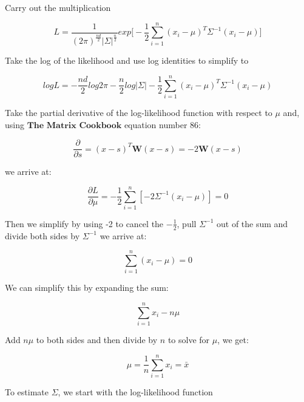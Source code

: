 \documentclass{article}
\begin{document}
\noindent  Carry out the multiplication

\begin{equation}
L = \frac{1}{(2\pi)^{\frac{nd}{2}} | \Sigma |^{\frac{n}{2}}} exp \bigg[ -\frac{1}{2} \sum\limits_{i = 1}^n (x_i - \mu)^T \Sigma^{-1} (x_i - \mu)  \bigg]
\end{equation}

\noindent Take the log of the likelihood and use log identities to simplify to

\begin{equation}
log L = - \frac{nd}{2} log 2\pi - \frac{n}{2} log | \Sigma| - \frac{1}{2} \sum\limits_{i = 1}^n (x_i - \mu)^T \Sigma^{-1} (x_i - \mu)
\end{equation}

\noindent Take the partial derivative of the log-likelihood function with respect to $\mu$ and, using $\textbf{The Matrix Cookbook}$ equation number 86:

\begin{equation}
\frac{\partial}{\partial s} = (x - s)^T\textbf{W}(x - s) = -2\textbf{W}(x-s)
\end{equation}

\noindent we arrive at:

\begin{equation}
\frac{\partial L}{\partial \mu} = - \frac{1}{2} \sum\limits_{i = 1}^n [-2 \Sigma^{-1} (x_i - \mu)] = 0
\end{equation}

\noindent Then we simplify by using -2 to cancel the $-\frac{1}{2}$, pull $\Sigma^{-1}$ out of the sum and divide both sides by $\Sigma^{-1}$ we arrive at:

\begin{equation}
\sum\limits_{i = 1}^n (x_i - \mu) = 0
\end{equation}

\noindent We can simplify this by expanding the sum:

\begin{equation}
\sum\limits_{i=1}^n x_i - n\mu
\end{equation}

\noindent Add $n\mu$ to both sides and then divide by $n$ to solve for $\mu$, we get:

\begin{equation}
\mu = \frac{1}{n} \sum\limits_{i = 1}^n x_i = \bar{x}
\end{equation}


\noindent To estimate $\Sigma$, we start with the log-likelihood function
\end{document}
